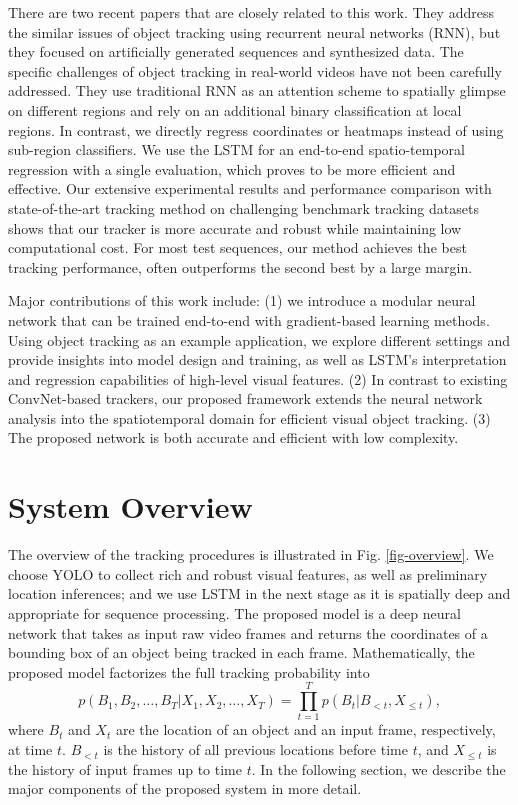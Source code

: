 \documentclass{article}
\begin{document}
There are two  recent papers \citep{kahou2015ratm, gan2015first} that are closely related to this work.
They address  the similar issues of object tracking using recurrent neural networks (RNN), but they focused on artificially generated sequences and synthesized data. The specific challenges of object tracking  in real-world videos have not been carefully addressed. 
They use traditional RNN as an attention scheme to spatially glimpse on different regions and rely on an additional binary classification at local regions. In contrast, we directly regress coordinates or heatmaps instead of using sub-region classifiers. We use the LSTM for an end-to-end spatio-temporal regression with a single evaluation, which proves to be more efficient and effective. 
Our extensive experimental results and performance comparison with state-of-the-art tracking method on challenging benchmark tracking datasets shows that our tracker is more accurate and robust while maintaining low computational cost. For most test sequences, our method achieves the best tracking performance, often outperforms the second best by a large margin. 
     
Major contributions of this work include: 
(1) we introduce a modular neural network that can be trained end-to-end with gradient-based learning methods. Using object tracking as an example application, we explore different settings and provide insights into model design and training, as well as LSTM's interpretation and regression capabilities of high-level visual features.
(2) In contrast to existing ConvNet-based trackers, our proposed framework extends the neural network analysis into the spatiotemporal domain for efficient visual object tracking.
(3) The proposed network is both accurate and efficient with low complexity.

  
\section{System Overview} \label{system-overview}
      
        
The overview of the tracking procedures is illustrated in Fig. \ref{fig-overview}. 
We choose YOLO to collect rich and robust visual features, as well as preliminary location inferences; and we use LSTM in the next stage as it is spatially deep and appropriate for sequence processing. 
The proposed model is a deep neural network that takes as input raw video frames and returns the coordinates of a bounding box of an object being tracked in each frame. Mathematically, the proposed model factorizes the full tracking probability into
\begin{equation}
      	p(B_{1}, B_{2}, …, B_{T} | X_{1}, X_{2}, …, X_{T}) = \prod_{t=1}^{T} p(B_{t} | B_{<t}, X_{\leq t}),
\end{equation}
where $B_{t}$ and $X_{t}$ are the location of an object and an input frame, respectively, at time $t$. $B_{<t}$ is the history of all previous locations before time $t$, and $X_{\leq t}$ is the history of input frames up to time $t$. 
In the following section, we describe the major components of the proposed system in more detail.
\end{document}
